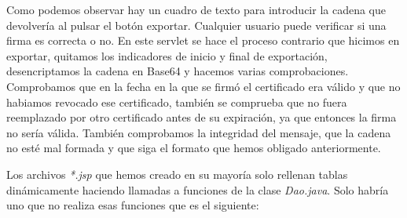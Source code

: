 \begin{description}
Como podemos observar hay un cuadro de texto para introducir la cadena que devolvería al pulsar el botón exportar. Cualquier usuario puede verificar si una firma es correcta o no. En este servlet se hace el proceso contrario que hicimos en exportar, quitamos los indicadores de inicio y final de exportación, desencriptamos la cadena en Base64 y hacemos varias comprobaciones. Comprobamos que en la fecha en la que se firmó el certificado era válido y que no habiamos revocado ese certificado, también se comprueba que no fuera reemplazado por otro certificado antes de su expiración, ya que entonces la firma no sería válida. También comprobamos la integridad del mensaje, que la cadena no esté mal formada y que siga el formato que hemos obligado anteriormente.
\end{description}

Los archivos \textit{*.jsp} que hemos creado en su mayoría solo rellenan tablas dinámicamente haciendo llamadas a funciones de la clase \textit{Dao.java}. Solo habría uno que no realiza esas funciones que es el siguiente:
